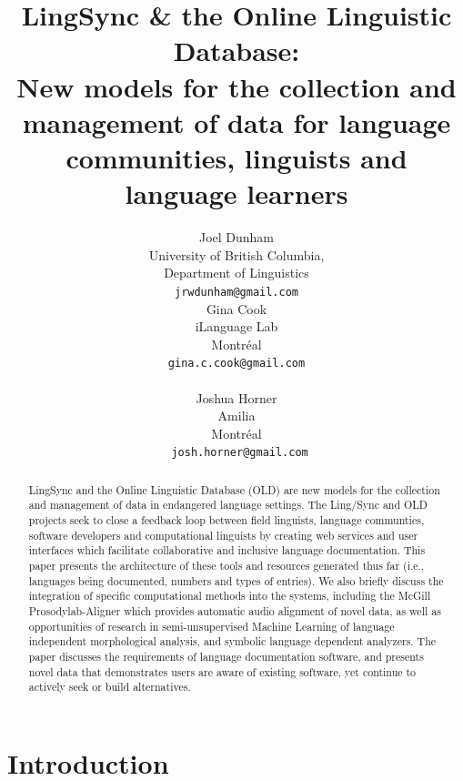 \documentclass[11pt]{article}
\title{LingSync \& the Online Linguistic Database:\\New models for the
    collection and management of data for language communities, linguists and
language learners}
\author{Joel Dunham \\
University of British Columbia,   \\
Department of Linguistics \\
{\tt jrwdunham@gmail.com} \\\And
Gina Cook \\
iLanguage Lab \\
Montr\'eal \\
{\tt gina.c.cook@gmail.com} \\  \\\And
Joshua Horner \\
Amilia  \\
Montr\'eal \\
{\tt ~josh.horner@gmail.com} \\ }
\date{}
\begin{document}
\maketitle

\begin{abstract}
LingSync and the Online Linguistic Database (OLD) are new models for the
collection and management of data in endangered language settings. The
Ling\-/Sync and OLD projects seek to close a feedback loop  between field linguists, language communties, software developers and computational linguists  by creating web services and user interfaces which facilitate
collaborative and inclusive language documentation. This paper presents the
architecture of these tools and resources generated thus far (i.e., languages
being documented, numbers and types of entries). We also briefly discuss the
integration of specific computational methods into the systems, including the 
McGill Prosodylab-Aligner which provides automatic audio
alignment of novel data, as well as opportunities of research in semi-unsupervised Machine Learning of  language
independent morphological analysis, and symbolic language dependent analyzers. 
The paper discusses the requirements of language documentation software, and presents novel data that demonstrates users are aware of existing software, yet continue to actively seek or build alternatives.
\end{abstract}



\section{Introduction}
\end{document}
